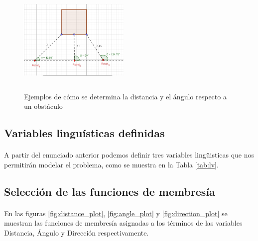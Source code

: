 \documentclass[a4paper,10pt]{article}
\begin{document}
	 \begin{figure}[h]
		\begin{center}
			\includegraphics[width=200px, height=200px]{images/distance_angle.jpg}
		\end{center}
		\caption{Ejemplos de cómo se determina la distancia y el ángulo respecto a un obstáculo \label{fig:distance_angle}}%
	\end{figure}

\subsection{Variables linguísticas definidas}\label{sub:variables}
\paragraph{}A partir del enunciado anterior podemos definir tres variables lingüisticas que nos permitirán modelar el problema, como se muestra en la Tabla \ref{tab:lv}.




\subsection{Selección de las funciones de membresía}\label{sub:membership_functions}
	\paragraph{} En las figuras \ref{fig:distance_plot}, \ref{fig:angle_plot} y \ref{fig:direction_plot} se muestran las funciones de membresía asignadas a los términos de las variables Distancia, Ángulo y Dirección respectivamente.
	   
\end{document}
